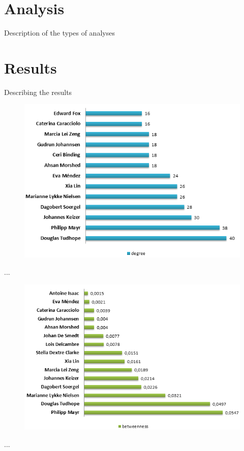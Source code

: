 \documentclass[runningheads,a4paper]{llncs}
\begin{document}
\section{Analysis}\label{analysis}
Description of the types of analyses %

\section{Results}\label{results}
Describing the results %



\begin{figure}
\centering
\includegraphics[width=0.7\linewidth]{degree16}
\caption{}
\label{fig:degree16}
\end{figure}

...

\begin{figure}
\centering
\includegraphics[width=0.7\linewidth]{betweenness}
\caption{}
\label{fig:betweenness}
\end{figure}

...
\end{document}
